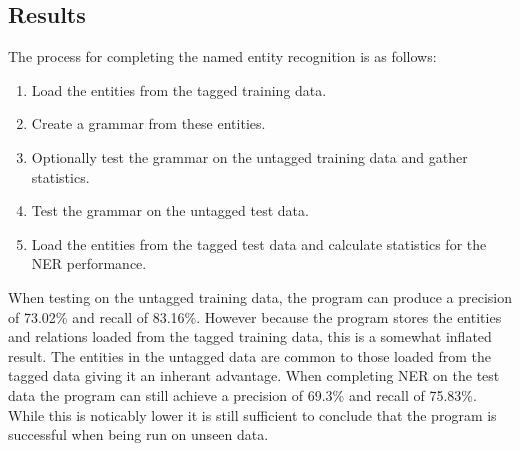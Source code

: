 \documentclass[draft]{article}
\begin{document}
\begin{multicols*}{2}
\section*{Results}
The process for completing the named entity recognition is as follows:
\begin{enumerate}
\item Load the entities from the tagged training data.
\item Create a grammar from these entities.
\item Optionally test the grammar on the untagged training data and gather statistics.
\item Test the grammar on the untagged test data.
\item Load the entities from the tagged test data and calculate statistics for the NER performance.
\end{enumerate}
When testing on the untagged training data, the program can produce a precision of 73.02\% and recall of 83.16\%. However because the program stores the entities and relations loaded from the tagged training data, this is a somewhat inflated result. The entities in the untagged data are common to those loaded from the tagged data giving it an inherant advantage. When completing NER on the test data the program can still achieve a precision of 69.3\% and recall of 75.83\%. While this is noticably lower it is still sufficient to conclude that the program is successful when being run on unseen data.



\end{multicols*}
\end{document}
